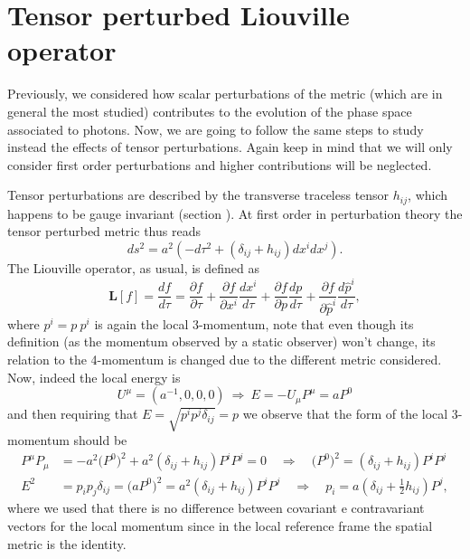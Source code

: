 \section{Tensor perturbed Liouville operator}\label{app:tensorPerturbedLiouvilleOperator}
Previously, we considered how scalar perturbations of the metric (which are in general the most studied) contributes to the evolution of the phase space associated to photons. Now, we are going to follow the same steps to study instead the effects of tensor perturbations. Again keep in mind that we will only consider first order perturbations and higher contributions will be neglected.

Tensor perturbations are described by the transverse traceless tensor $h_{ij}$, which happens to be gauge invariant (section ). At first order in perturbation theory the tensor perturbed metric thus reads 
$$ds^2=a^2(-d\tau^2+(\delta_{ij}+h_{ij})dx^idx^j).$$
The Liouville operator, as usual, is defined as
$$\hat{\mathbf{L}}[f]=\frac{df}{d\tau}=\frac{\partial f}{\partial \tau}+\frac{\partial f}{\partial x^i}\frac{d x^i}{d\tau}+\frac{\partial f}{\partial p}\frac{d p}{d\tau}+\frac{\partial f}{\partial \hat p^i}\frac{d \hat p^i}{d\tau},$$
where $p^i=p\ p^i$ is again the local 3-momentum, note that even though its definition (as the momentum observed by a static observer) won't change, its relation to the 4-momentum is changed due to the different metric considered. Now, indeed the local energy is
$$U^\mu=(a^{-1},0,0,0)\ \Rightarrow\ E=-U_\mu P^\mu= aP^0$$
and then requiring that $E=\sqrt{p^ip^j\delta_{ij}}=p$ we observe that the form of the local 3-momentum should be
\begin{align*}
    P^\mu P_\mu&=-a^2\big(P^0\big)^2+a^2(\delta_{ij}+h_{ij})P^iP^j=0\quad\Rightarrow \quad\big(P^0\big)^2=(\delta_{ij}+h_{ij})P^iP^j\\E^2&=p_ip_j\delta_{ij}=\big(aP^0\big)^2=a^2(\delta_{ij}+h_{ij})P^iP^j\quad\Rightarrow \quad p_i=a(\delta_{ij}+\frac{1}{2}h_{ij})P^j,
\end{align*} 
where we used that there is no difference between covariant e contravariant vectors for the local momentum since in the local reference frame the spatial metric is the identity.

